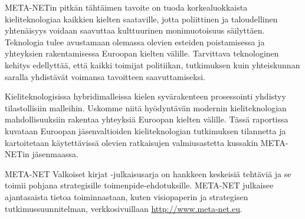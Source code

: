 \begin{multicols}{2}

META-NETin pitkän tähtäimen tavoite on tuoda korkealuokkaista kieliteknologiaa kaikkien kielten saataville, jotta poliittinen ja taloudellinen yhtenäisyys voidaan saavuttaa kulttuurinen monimuotoisuus säilyttäen. Teknologia tulee avustamaan olemassa olevien esteiden poistamisessa ja yhteyksien rakentamisessa Euroopan kielten välille. Tarvittava teknologinen kehitys edellyttää, että kaikki toimijat politiikan, tutkimuksen kuin yhteiskunnan saralla yhdistävät voimansa tavoitteen saavuttamiseksi.

Kieliteknologisissa hybridimalleissa kielen syvärakenteen prosessointi yhdistyy tilastollisiin malleihin. Uskomme niitä hyödyntävän modernin kieliteknologian mahdollisuuksiin rakentaa yhteyksiä Euroopan kielten välille. Tässä raportissa kuvataan Euroopan jäsenvaltioiden kieliteknologian tutkimuksen tilannetta ja kartoitetaan käytettävissä olevien ratkaisujen valmiusastetta kussakin META-NETin jäsenmaassa.

META-NET Valkoiset kirjat -julkaisusarja on hankkeen keskeisiä tehtäviä ja se toimii pohjana strategisille toimenpide-ehdotuksille. META-NET julkaisee ajantasaista tietoa toiminnastaan, kuten visiopaperin \cite{Vision} ja strategisen tutkimussuunnitelman, verkkosivuillaan \url{http://www.meta-net.eu}.  
\end{multicols}

\clearpage

